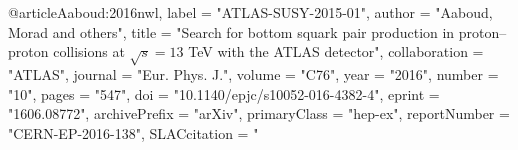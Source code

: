 

@article{Aaboud:2016nwl,
      label          = "ATLAS-SUSY-2015-01",
      author         = "Aaboud, Morad and others",
      title          = "{Search for bottom squark pair production in
                        proton--proton collisions at $\sqrt{s}=13$  TeV with the
                        ATLAS detector}",
      collaboration  = "ATLAS",
      journal        = "Eur. Phys. J.",
      volume         = "C76",
      year           = "2016",
      number         = "10",
      pages          = "547",
      doi            = "10.1140/epjc/s10052-016-4382-4",
      eprint         = "1606.08772",
      archivePrefix  = "arXiv",
      primaryClass   = "hep-ex",
      reportNumber   = "CERN-EP-2016-138",
      SLACcitation   = "%
}

